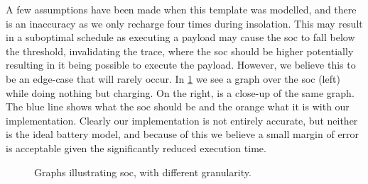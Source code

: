 A few assumptions have been made when this template was modelled, and there is an inaccuracy as we only recharge four times during insolation.
This may result in a suboptimal schedule as executing a payload may cause the \gls{soc} to fall below the threshold, invalidating the trace, where the \gls{soc} should be higher potentially resulting in it being possible to execute the payload.
However, we believe this to be an edge-case that will rarely occur.
In \cref{fig:granularity} we see a graph over the \gls{soc} (left) while doing nothing but charging.
On the right, is a close-up of the same graph.
The blue line shows what the \gls{soc} should be and the orange what it is with our implementation.
Clearly our implementation is not entirely accurate, but neither is the ideal battery model, and because of this we believe a small margin of error is acceptable given the significantly reduced execution time.

\begin{figure}[h]%
	\centering
	\qquad
	\caption{Graphs illustrating \gls{soc}, with different granularity.}
	\label{fig:granularity}%
\end{figure}

